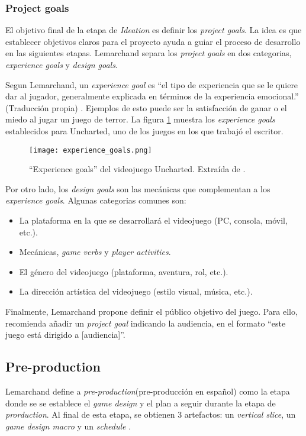 \subsubsection{Project goals}
\par El objetivo final de la etapa de \textit{Ideation} es definir los \textit{project goals}. La idea es que establecer objetivos claros para el proyecto ayuda a guiar el proceso de desarrollo en las siguientes etapas. Lemarchand separa los \textit{project goals} en dos categorias, \textit{experience goals} y \textit{design goals}. 
\bigbreak
\par Segun Lemarchand, un \textit{experience goal} es ``el tipo de experiencia que se le quiere dar al jugador, generalmente explicada en términos de la experiencia emocional.'' (Traducción propia) \cite{lemarchandPlayfulProductionProcess2021}. Ejemplos de esto puede ser la satisfacción de ganar o el miedo al jugar un juego de terror. La figura \ref{fig:x ejemplo de experience goals Lemarchand} muestra los \textit{experience goals} establecidos para Uncharted, uno de los juegos en los que trabajó el escritor.
%
\begin{figure}[H]
    \centering
    \texttt{[image: experience\_goals.png]}
    \caption{``Experience goals'' del videojuego Uncharted. Extraída de \cite{lemarchandPlayfulProductionProcess2021}.}
    \label{fig:x ejemplo de experience goals Lemarchand}
\end{figure} 
%
\par Por otro lado, los \textit{design goals} son las mecánicas que complementan a los \textit{experience goals}. Algunas categorias comunes son:
\begin{itemize}
    \item La plataforma en la que se desarrollará el videojuego (PC, consola, móvil, etc.).
    \item Mecánicas, \textit{game verbs} y \textit{player activities}.
    \item El género del videojuego (plataforma, aventura, rol, etc.).
    \item La dirección artística del videojuego (estilo visual, música, etc.).
\end{itemize}
\par Finalmente, Lemarchand propone definir el público objetivo del juego. Para ello, recomienda añadir un \textit{project goal} indicando la audiencia, en el formato ``este juego está dirigido a [audiencia]''.
%
%
%
\subsection{Pre-production}
\par Lemarchand define a \textit{pre-production}(pre-producción en español) como la etapa donde se se establece el \textit{game design} y el plan a seguir durante la etapa de \textit{prorduction}. Al final de esta etapa, se obtienen 3 artefactos: un \textit{vertical slice}, un \textit{game design macro} y un \textit{schedule} \cite{lemarchandPlayfulProductionProcess2021}.
%
%
